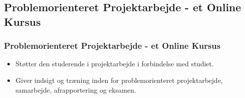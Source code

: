 \documentclass[t, aspectratio=169]{beamer}
\begin{document}
\subsection{Problemorienteret Projektarbejde - et Online Kursus}
\begin{frame}[fragile]
  \frametitle{Problemorienteret Projektarbejde - et Online Kursus}
  \vspace{1mm}
  \begin{itemize}
    \item Støtter den studerende i projektarbejde i forbindelse med studiet.
    \item Giver indsigt og træning inden for problemorienteret projektarbejde,
samarbejde, afrapportering og eksamen.
  \end{itemize}
  
\end{frame}
\end{document}
